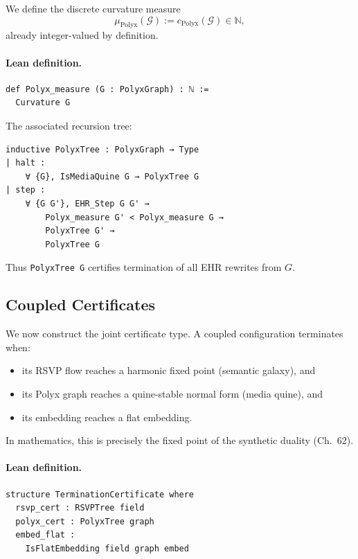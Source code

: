 We define the discrete curvature measure
\[
   \mu_{\mathrm{Polyx}}(\mathcal{G}) := c_{\mathrm{Polyx}}(\mathcal{G}) \in \mathbb{N},
\]
already integer-valued by definition.

\paragraph{Lean definition.}

\begin{verbatim}
def Polyx_measure (G : PolyxGraph) : ℕ :=
  Curvature G
\end{verbatim}

The associated recursion tree:

\begin{verbatim}
inductive PolyxTree : PolyxGraph → Type
| halt :
    ∀ {G}, IsMediaQuine G → PolyxTree G
| step :
    ∀ {G G'}, EHR_Step G G' →
        Polyx_measure G' < Polyx_measure G →
        PolyxTree G' →
        PolyxTree G
\end{verbatim}

Thus \texttt{PolyxTree G} certifies termination of all EHR rewrites from $G$.

\subsection{Coupled Certificates}

We now construct the joint certificate type.  
A coupled configuration terminates when:

\begin{itemize}
\item its RSVP flow reaches a harmonic fixed point (semantic galaxy), and  
\item its Polyx graph reaches a quine-stable normal form (media quine), and  
\item its embedding reaches a flat embedding.
\end{itemize}

In mathematics, this is precisely the fixed point of the synthetic duality (Ch.~62).

\paragraph{Lean definition.}

\begin{verbatim}
structure TerminationCertificate where
  rsvp_cert : RSVPTree field
  polyx_cert : PolyxTree graph
  embed_flat :
    IsFlatEmbedding field graph embed
\end{verbatim}

